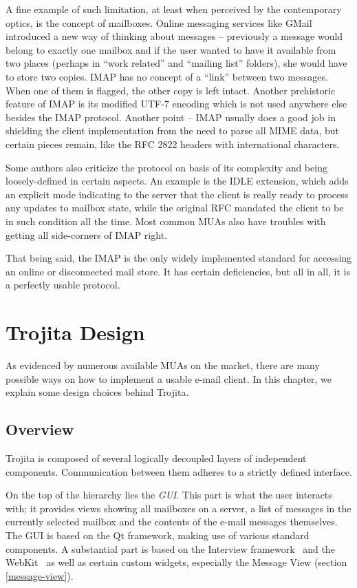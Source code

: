 \documentclass[12pt,notitlepage]{report}
\newcommand{\trojita}{Trojita\xspace}
\begin{document}
A fine example of such limitation, at least when perceived by the contemporary
optics, is the concept of mailboxes.  Online messaging services like GMail
introduced a new way of thinking about messages -- previously a message would
belong to exactly one mailbox and if the user wanted to have it available from two
places (perhaps in ``work related'' and ``mailing list'' folders), she would
have to store two copies.  IMAP has no concept of a ``link'' between two
messages.  When one of them is flagged, the other copy is left intact.  Another
prehistoric feature of IMAP is its modified UTF-7 encoding which is not used
anywhere else besides the IMAP protocol.  Another point -- IMAP usually does a
good job in shielding the client implementation from the need to parse all MIME
data, but certain pieces remain, like the RFC 2822 headers with international
characters.

Some authors also criticize the protocol on basis of its complexity and being
loosely-defined in certain aspects.  An example is the IDLE \cite{rfc-idle}
extension, which adds an explicit mode indicating to the server that the client
is really ready to process any updates to mailbox state, while the original RFC
mandated the client to be in such condition all the time.  Most common MUAs also
have troubles with getting all side-corners of IMAP right.

That being said, the IMAP is the only widely implemented standard for accessing
an online or disconnected mail store.  It has certain deficiencies, but all in
all, it is a perfectly usable protocol.

\chapter{\trojita Design}
\label{trojita-design}

As evidenced by numerous available MUAs on the market, there are many possible
ways on how to implement a usable e-mail client.  In this chapter, we explain
some design choices behind \trojita.

\section{Overview}

\trojita is composed of several logically decoupled layers of independent
components.  Communication between them adheres to a strictly defined interface.

On the top of the hierarchy lies the {\em GUI}.  This part is what the user
interacts with; it provides views showing all mailboxes on a server, a list of
messages in the currently selected mailbox and the contents of the e-mail
messages themselves.  The GUI is based on the Qt framework, making use of
various standard components.  A substantial part is based on the Interview
framework~\cite{qt-interview} and the WebKit~\cite{qt-webkit} as well as certain
custom widgets, especially the Message View (section \ref{message-view}).
\end{document}

